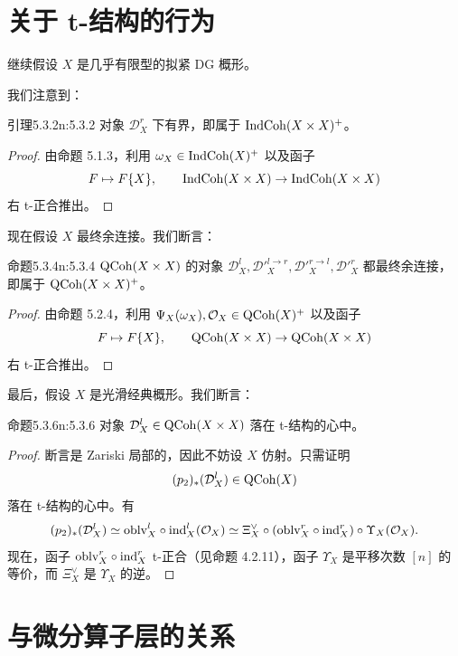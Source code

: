 \section{关于 t-结构的行为}

继续假设 $X$ 是几乎有限型的拟紧 DG 概形。

我们注意到：

\begin{othm}{引理}{5.3.2}{n:5.3.2}
对象 $\mathcal{D}^r_X$ 下有界，即属于 $\mathrm{IndCoh}(X\times X)^{+}$。
\end{othm}

\begin{proof}
由命题 5.1.3，利用 $\omega_X\in\mathrm{IndCoh}(X)^{+}$ 以及函子
\[
F\mapsto F\{X\},\qquad \mathrm{IndCoh}(X\times X)\to\mathrm{IndCoh}(X\times X)
\]
右 t-正合推出。
\end{proof}

现在假设 $X$ 最终余连接。我们断言：

\begin{othm}{命题}{5.3.4}{n:5.3.4}
$\mathrm{QCoh}(X\times X)$ 的对象 $\mathcal{D}^l_X,\mathcal{D}'^{l\to r}_X,\mathcal{D}'^{r\to l}_X,\mathcal{D}'^r_X$ 都最终余连接，即属于 $\mathrm{QCoh}(X\times X)^{+}$。
\end{othm}

\begin{proof}
由命题 5.2.4，利用 $\Psi_X(\omega_X),\mathcal{O}_X\in\mathrm{QCoh}(X)^{+}$ 以及函子
\[
F\mapsto F\{X\},\qquad \mathrm{QCoh}(X\times X)\to\mathrm{QCoh}(X\times X)
\]
右 t-正合推出。
\end{proof}

最后，假设 $X$ 是光滑经典概形。我们断言：

\begin{othm}{命题}{5.3.6}{n:5.3.6}
对象 $\mathcal{D}^l_X\in\mathrm{QCoh}(X\times X)$ 落在 t-结构的心中。
\end{othm}

\begin{proof}
断言是 Zariski 局部的，因此不妨设 $X$ 仿射。只需证明
\[
(p_2)_*(\mathcal{D}^l_X)\in\mathrm{QCoh}(X)
\]
落在 t-结构的心中。有
\[
(p_2)_*(\mathcal{D}^l_X)\simeq\mathrm{oblv}^l_X\circ\mathrm{ind}^l_X(\mathcal{O}_X)\simeq\Xi^{\vee}_X\circ(\mathrm{oblv}^r_X\circ\mathrm{ind}^r_X)\circ\Upsilon_X(\mathcal{O}_X).
\]
现在，函子 $\mathrm{oblv}^r_X\circ\mathrm{ind}^r_X$ t-正合（见命题 4.2.11），函子 $\Upsilon_X$ 是平移次数 $[n]$ 的等价，而 $\Xi^{\vee}_X$ 是 $\Upsilon_X$ 的逆。
\end{proof}

\section{与微分算子层的关系}

